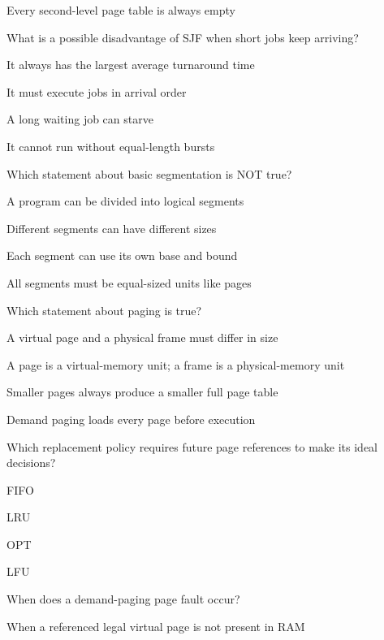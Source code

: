 \begin{questions}
\begin{verticalchoices}
\item Every second-level page table is always empty
\end{verticalchoices}
\question What is a possible disadvantage of SJF when short jobs keep arriving?
\begin{verticalchoices}
\item It always has the largest average turnaround time
\item It must execute jobs in arrival order
\item A long waiting job can starve
\item It cannot run without equal-length bursts
\end{verticalchoices}
\end{questions}\vfill\newpage
\begin{questions}\setlength{\itemsep}{0.12cm}\setcounter{question}{36}
\question Which statement about basic segmentation is NOT true?
\begin{verticalchoices}
\item A program can be divided into logical segments
\item Different segments can have different sizes
\item Each segment can use its own base and bound
\item All segments must be equal-sized units like pages
\end{verticalchoices}
\question Which statement about paging is true?
\begin{verticalchoices}
\item A virtual page and a physical frame must differ in size
\item A page is a virtual-memory unit; a frame is a physical-memory unit
\item Smaller pages always produce a smaller full page table
\item Demand paging loads every page before execution
\end{verticalchoices}
\question Which replacement policy requires future page references to make its ideal decisions?
\begin{verticalchoices}
\item FIFO
\item LRU
\item OPT
\item LFU
\end{verticalchoices}
\question When does a demand-paging page fault occur?
\begin{verticalchoices}
\item When a referenced legal virtual page is not present in RAM

\end{verticalchoices}
\end{questions}

